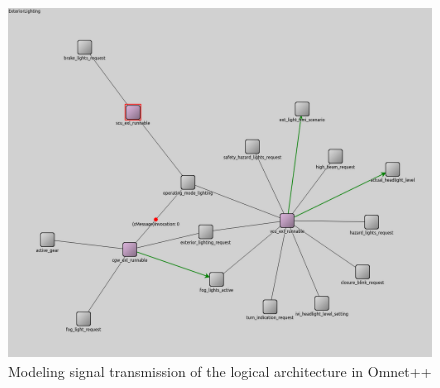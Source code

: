 \begin{figure}[htb]
    \centering
    \includegraphics[width=\textwidth]{images/logical_sim.png}
    \caption{Modeling signal transmission of the logical architecture in Omnet++}
    \label{fig:logical_sim}
\end{figure}
\newpage